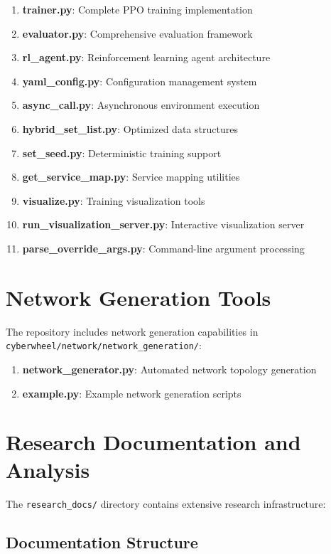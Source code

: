 \documentclass[12pt,a4paper]{article}
\begin{document}
\begin{enumerate}
    \item \textbf{trainer.py}: Complete PPO training implementation
    \item \textbf{evaluator.py}: Comprehensive evaluation framework
    \item \textbf{rl\_agent.py}: Reinforcement learning agent architecture
    \item \textbf{yaml\_config.py}: Configuration management system
    \item \textbf{async\_call.py}: Asynchronous environment execution
    \item \textbf{hybrid\_set\_list.py}: Optimized data structures
    \item \textbf{set\_seed.py}: Deterministic training support
    \item \textbf{get\_service\_map.py}: Service mapping utilities
    \item \textbf{visualize.py}: Training visualization tools
    \item \textbf{run\_visualization\_server.py}: Interactive visualization server
    \item \textbf{parse\_override\_args.py}: Command-line argument processing
\end{enumerate}

\section{Network Generation Tools}

The repository includes network generation capabilities in \texttt{cyberwheel/network/network\_generation/}:

\begin{enumerate}
    \item \textbf{network\_generator.py}: Automated network topology generation
    \item \textbf{example.py}: Example network generation scripts
\end{enumerate}

\section{Research Documentation and Analysis}

The \texttt{research\_docs/} directory contains extensive research infrastructure:

\subsection{Documentation Structure}
\end{document}
